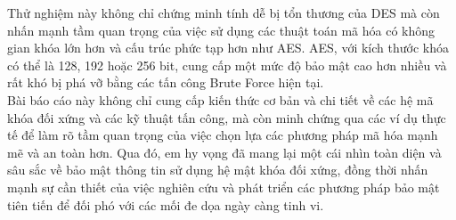 Thử nghiệm này không chỉ chứng minh tính dễ bị tổn thương của DES mà còn nhấn mạnh tầm quan trọng của việc sử dụng các thuật toán mã hóa có không gian khóa lớn hơn và cấu trúc phức tạp hơn như AES. AES, với kích thước khóa có thể là 128, 192 hoặc 256 bit, cung cấp một mức độ bảo mật cao hơn nhiều và rất khó bị phá vỡ bằng các tấn công Brute Force hiện tại.\\

Bài báo cáo này không chỉ cung cấp kiến thức cơ bản và chi tiết về các hệ mã khóa đối xứng và các kỹ thuật tấn công, mà còn minh chứng qua các ví dụ thực tế để làm rõ tầm quan trọng của việc chọn lựa các phương pháp mã hóa mạnh mẽ và an toàn hơn. Qua đó, em hy vọng đã mang lại một cái nhìn toàn diện và sâu sắc về bảo mật thông tin sử dụng hệ mật khóa đối xứng, đồng thời nhấn mạnh sự cần thiết của việc nghiên cứu và phát triển các phương pháp bảo mật tiên tiến để đối phó với các mối đe dọa ngày càng tinh vi.

